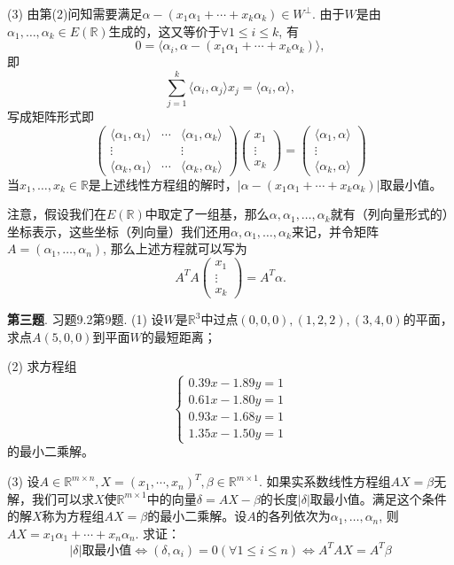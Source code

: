 (3) 由第(2)问知需要满足$\alpha - (x_1\alpha_1 + \cdots + x_k\alpha_k) \in W^{\perp}$. 由于$W$是由$\alpha_1, \ldots, \alpha_k \in E(\mathbb{R})$生成的，这又等价于$\forall 1 \leqslant i \leqslant k$, 有
$$0 = \langle \alpha_i, \alpha - (x_1\alpha_1 + \cdots + x_k\alpha_k) \rangle,$$
即
$$\sum\limits_{j=1}^k \langle \alpha_i, \alpha_j \rangle x_j = \langle \alpha_i, \alpha \rangle,$$
写成矩阵形式即
$$
\begin{pmatrix}
\langle \alpha_1, \alpha_1 \rangle & \cdots & \langle \alpha_1, \alpha_k \rangle \\
\vdots & & \vdots \\
\langle \alpha_k, \alpha_1 \rangle & \cdots & \langle \alpha_k, \alpha_k \rangle
\end{pmatrix}
\begin{pmatrix}
x_1 \\ \vdots \\ x_k
\end{pmatrix} = 
\begin{pmatrix}
\langle \alpha_1, \alpha \rangle \\
\vdots \\
\langle \alpha_k, \alpha \rangle
\end{pmatrix}
$$
当$x_1, \ldots, x_k \in \mathbb{R}$是上述线性方程组的解时，$\lvert \alpha - (x_1\alpha_1 + \cdots + x_k\alpha_k) \rvert$取最小值。

注意，假设我们在$E(\mathbb{R})$中取定了一组基，那么$\alpha, \alpha_1, \ldots, \alpha_k$就有（列向量形式的）坐标表示，这些坐标（列向量）我们还用$\alpha, \alpha_1, \ldots, \alpha_k$来记，并令矩阵$A = (\alpha_1, \ldots, \alpha_n)$, 那么上述方程就可以写为
$$A^TA \begin{pmatrix} x_1 \\ \vdots \\ x_k \end{pmatrix} = A^T \alpha.$$


\newpageorvspace


{\bf 第三题}. 习题9.2第9题. (1) 设$W$是$\mathbb{R}^3$中过点$(0,0,0), (1,2,2), (3,4,0)$的平面，求点$A (5,0,0)$到平面$W$的最短距离；

(2) 求方程组
$$
\begin{cases}
0.39x - 1.89y = 1 \\
0.61x - 1.80y = 1 \\
0.93x - 1.68y = 1 \\
1.35x - 1.50y = 1
\end{cases}
$$
的最小二乘解。

(3) 设$A\in\mathbb{R}^{m\times n}, X = (x_1,\cdots,x_n)^T, \beta\in\mathbb{R}^{m\times 1}$. 如果实系数线性方程组$AX = \beta$无解，我们可以求$X$使$\mathbb{R}^{m\times 1}$中的向量$\delta = AX - \beta$的长度$\lvert \delta \rvert$取最小值。满足这个条件的解$X$称为方程组$AX = \beta$的最小二乘解。设$A$的各列依次为$\alpha_1, \ldots, \alpha_n$, 则$AX = x_1\alpha_1 + \cdots + x_n\alpha_n$. 求证：
$$\lvert \delta \rvert \text{取最小值} \Longleftrightarrow (\delta, \alpha_i) = 0 (\forall 1\leqslant i \leqslant n) \Longleftrightarrow A^TAX = A^T\beta$$

